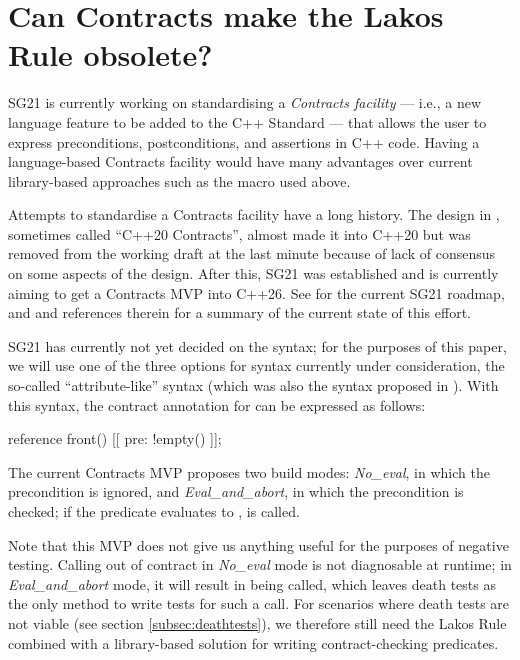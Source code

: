 \section{Can Contracts make the Lakos Rule obsolete?}
\label{sec:contracts}

SG21 is currently working on standardising a \emph{Contracts facility} --- i.e., a new language feature to be added to the C++ Standard --- that allows the user to express preconditions, postconditions, and assertions in C++ code. Having a language-based Contracts facility would have many advantages over current library-based approaches such as the  macro used above.

Attempts to standardise a Contracts facility have a long history. The design in \cite{P0542R5}, sometimes called ``C++20 Contracts'', almost made it into C++20 but was removed from the working draft at the last minute because of lack of consensus on some aspects of the design. After this, SG21 was established and is currently aiming to get a Contracts MVP into C++26. See \cite{P2695R1} for the current SG21 roadmap, and \cite{P2521R3} and references therein for a summary of the current state of this effort.

SG21 has currently not yet decided on the syntax; for the purposes of this paper, we will use one of the three options for syntax currently under consideration, the so-called ``attribute-like'' syntax (which was also the syntax proposed in \cite{P0542R5}). With this syntax, the contract annotation for  can be expressed as follows:
\begin{codeblock}
reference front() [[ pre: !empty() ]];
\end{codeblock}

The current Contracts MVP proposes two build modes: \emph{No_eval}, in which the precondition is ignored, and \emph{Eval_and_abort}, in which the precondition is checked; if the predicate evaluates to ,  is called.

Note that this MVP does not give us anything useful for the purposes of negative testing. Calling  out of contract in \emph{No_eval} mode is not diagnosable at runtime; in \mbox{\emph{Eval_and_abort}} mode, it will result in  being called, which leaves death tests as the only method to write tests for such a call. For scenarios where death tests are not viable (see section \ref{subsec:deathtests}), we therefore still need the Lakos Rule combined with a library-based solution for writing contract-checking predicates.

